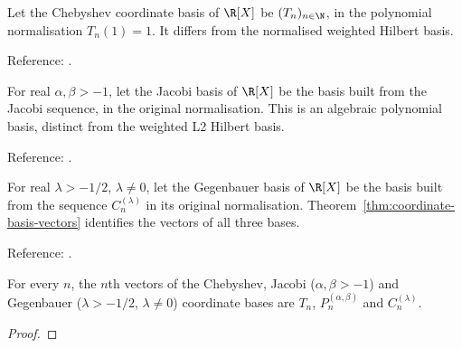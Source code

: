 \begin{supporting}
\begin{definition}
\label{def:chebyshev-polynomial-basis}
\leanok
Let the Chebyshev coordinate basis of $\R[X]$ be $(T_n)_{n\in\N}$, in the
polynomial normalisation $T_n(1)=1$. It differs from the normalised weighted
Hilbert basis.

Reference: \cite[Sections 2--3]{olver-townsend}.
\end{definition}

\begin{definition}
\label{def:jacobi-polynomial-basis}
\leanok
For real $\alpha,\beta>-1$, let the Jacobi basis of $\R[X]$ be the basis built
from the Jacobi sequence, in the original normalisation. This is an algebraic
polynomial basis, distinct from the weighted L2 Hilbert basis.

Reference: \cite[Table 18.3.1]{dlmf}.
\end{definition}

\begin{definition}
\label{def:gegenbauer-polynomial-basis}
\leanok
For real $\lambda>-1/2$, $\lambda\ne0$, let the Gegenbauer basis of $\R[X]$ be
the basis built from the sequence $C_n^{(\lambda)}$ in its original
normalisation. Theorem~\ref{thm:coordinate-basis-vectors} identifies the vectors
of all three bases.

Reference: \cite[Table 18.3.1]{dlmf}.
\end{definition}

\begin{theorem}
\label{thm:coordinate-basis-vectors}
\leanok
For every $n$, the $n$th vectors of the Chebyshev, Jacobi ($\alpha,\beta>-1$)
and Gegenbauer ($\lambda>-1/2$, $\lambda\ne0$) coordinate bases are $T_n$,
$P_n^{(\alpha,\beta)}$ and $C_n^{(\lambda)}$.
\end{theorem}
\begin{proof}
\leanok
\end{proof}


\end{supporting}
